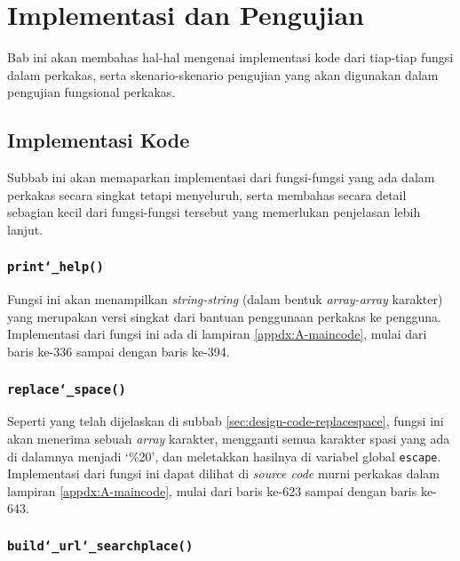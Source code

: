 \chapter{Implementasi dan Pengujian}
\label{chap:testing}

Bab ini akan membahas hal-hal mengenai implementasi kode dari tiap-tiap fungsi dalam perkakas, serta skenario-skenario pengujian yang akan digunakan dalam pengujian fungsional perkakas.

\section{Implementasi Kode}
\label{sec:testing-implementation}

Subbab ini akan memaparkan implementasi dari fungsi-fungsi yang ada dalam perkakas secara singkat tetapi menyeluruh, serta membahas secara detail sebagian kecil dari fungsi-fungsi tersebut yang memerlukan penjelasan lebih lanjut.

\subsection{\texttt{print\char`_help()}}
\label{sec:testing-implementation-printhelp}

Fungsi ini akan menampilkan \textit{string-string} (dalam bentuk \textit{array-array} karakter) yang merupakan versi singkat dari bantuan penggunaan perkakas ke pengguna. Implementasi dari fungsi ini ada di lampiran \ref{appdx:A-maincode}, mulai dari baris ke-336 sampai dengan baris ke-394.

\subsection{\texttt{replace\char`_space()}}
\label{sec:testing-implementation-replacespace}

Seperti yang telah dijelaskan di subbab \ref{sec:design-code-replacespace}, fungsi ini akan menerima sebuah \textit{array} karakter, mengganti semua karakter spasi yang ada di dalamnya menjadi `\%20', dan meletakkan hasilnya di variabel global \verb|escape|. Implementasi dari fungsi ini dapat dilihat di \textit{source code} murni perkakas dalam lampiran \ref{appdx:A-maincode}, mulai dari baris ke-623 sampai dengan baris ke-643.

\subsection{\texttt{build\char`_url\char`_searchplace()}}
\label{sec:testing-implementation-buildurl-searchplace}

